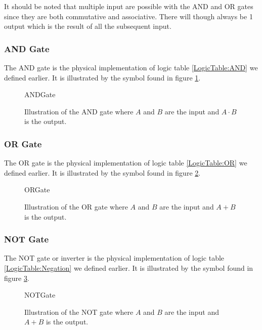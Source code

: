            It should be noted that multiple input are possible with the AND and OR gates since they are both commutative and associative. There will though always be 1 output which is the result of all the subsequent input.
            
            \subsubsection{AND Gate}
                The AND gate is the physical implementation of logic table \ref{LogicTable:AND} we defined earlier. It is illustrated by the symbol found in figure \ref{fig:ANDGate}. 
                
                \begin{figure}[h!]
                    \centering
                    {ANDGate}
                    \caption{Illustration of the AND gate where $A$ and $B$ are the input and $A\cdot B$ is the output.}
                    \label{fig:ANDGate}
                \end{figure}
            
            \subsubsection{OR Gate}
                The OR gate is the physical implementation of logic table \ref{LogicTable:OR} we defined earlier. It is illustrated by the symbol found in figure \ref{fig:ORGate}. 
                
                \begin{figure}[h!]
                    \centering
                    {ORGate}
                    \caption{Illustration of the OR gate where $A$ and $B$ are the input and $A+B$ is the output.}
                    \label{fig:ORGate}
                \end{figure} 
            
            \subsubsection{NOT Gate}
                The NOT gate or inverter is the physical implementation of logic table \ref{LogicTable:Negation} we defined earlier. It is illustrated by the symbol found in figure \ref{fig:NOTGate}. 
                
                \begin{figure}[h!]
                    \centering
                    {NOTGate}
                    \caption{Illustration of the NOT gate where $A$ and $B$ are the input and $A+B$ is the output.}
                    \label{fig:NOTGate}
                \end{figure}   
            
